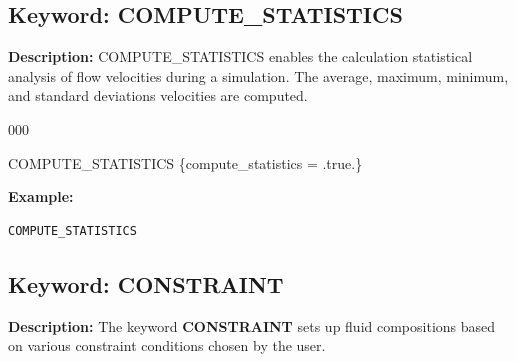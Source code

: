\documentclass[12pt]{article}
\begin{document}
\hyperlink{target_key}{\return}


\newpage
\protect\hypertarget{target_stat}{}

\subsection{Keyword: COMPUTE\_STATISTICS}

\noindent
{\bf Description:}
COMPUTE\_STATISTICS enables the calculation statistical analysis of flow velocities during a simulation.  The average, maximum, minimum, and standard deviations velocities are computed.

\begin{deflist}{000}
\item [COMPUTE\_STATISTICS] \{compute\_statistics = .true.\}
\end{deflist}


\begin{mdframed}

\noindent
{\bf Example:}
\begin{verbatim}
COMPUTE_STATISTICS
\end{verbatim}
\end{mdframed}

\hyperlink{target_key}{\return}


\newpage
\protect\hypertarget{target_constraint}{}

\subsection{Keyword: CONSTRAINT}

\noindent
{\bf Description:}
The keyword {\bf CONSTRAINT} sets up fluid compositions based on various constraint conditions chosen by the user.
\end{document}
